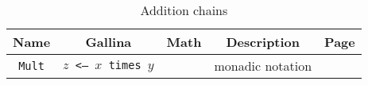 \documentclass[a4paper]{book}
\begin{document}
\begin{table}[H]
  \centering
  \begin{threeparttable}
    \caption{Addition chains}
\begin{tabular}{|c|c|c|c|l|}
\hline
Name & Gallina&Math& Description& Page \\\hline
\texttt{Mult} & \texttt{$z$ <--- $x$ times $y$} & & monadic notation & \pageref{monadic-mult} \\
\hline
\end{tabular}


  \end{threeparttable}
 
\end{table}
\end{document}
